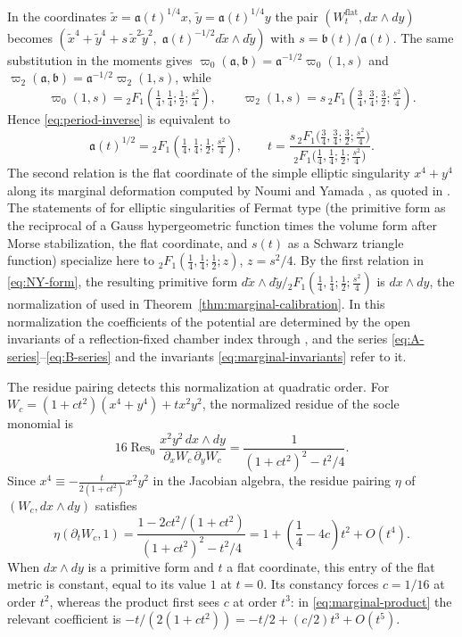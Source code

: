 In the coordinates $\tilde x=\mathfrak a(t)^{1/4}x$, $\tilde y=\mathfrak a(t)^{1/4}y$
the pair $(W^{\mathrm{flat}}_t,dx\wedge dy)$ becomes
$(\tilde x^4+\tilde y^4+s\,\tilde x^2\tilde y^2,\;
\mathfrak a(t)^{-1/2}d\tilde x\wedge d\tilde y)$ with $s=\mathfrak b(t)/\mathfrak a(t)$.  The
same substitution in the moments gives
$\varpi_0(\mathfrak a,\mathfrak b)=\mathfrak a^{-1/2}\varpi_0(1,s)$ and
$\varpi_2(\mathfrak a,\mathfrak b)=\mathfrak a^{-1/2}\varpi_2(1,s)$, while
\[
 \varpi_0(1,s)={}_2F_1\!\left(\tfrac14,\tfrac14;\tfrac12;\tfrac{s^2}4\right),
 \qquad
 \varpi_2(1,s)=s\,{}_2F_1\!\left(\tfrac34,\tfrac34;\tfrac32;\tfrac{s^2}4\right).
\]
Hence \eqref{eq:period-inverse} is equivalent to
\begin{equation}\label{eq:NY-form}
 \mathfrak a(t)^{1/2}={}_2F_1\!\left(\tfrac14,\tfrac14;\tfrac12;\tfrac{s^2}4\right),
 \qquad
 t=\frac{s\,{}_2F_1\bigl(\frac34,\frac34;\frac32;\frac{s^2}4\bigr)}
        {{}_2F_1\bigl(\frac14,\frac14;\frac12;\frac{s^2}4\bigr)} .
\end{equation}
The second relation is the flat coordinate of the simple elliptic
singularity $x^4+y^4$ along its marginal deformation computed by Noumi and
Yamada \cite{noumiyamada1998flat}, as quoted in
\cite[(7), case $\widetilde E_7$]{strachan2010}.
The statements of \cite[Props.~4.2.6--4.2.8]{maher2024predictions} for
elliptic singularities of Fermat type (the primitive form as the reciprocal
of a Gauss hypergeometric function times the volume form after Morse
stabilization, the flat coordinate, and $s(t)$ as a Schwarz triangle
function) specialize here to ${}_2F_1(\frac14,\frac14;\frac12;z)$,
$z=s^2/4$.  By the first relation in \eqref{eq:NY-form}, the resulting
primitive form
$d\tilde x\wedge d\tilde y/{}_2F_1(\frac14,\frac14;\frac12;\frac{s^2}4)$ is
$dx\wedge dy$, the normalization of \cite{grossetal2022open} used in
Theorem~\ref{thm:marginal-calibration}.  In this normalization the
coefficients of the potential are determined by the open invariants of a
reflection-fixed chamber index through \cite[(4.11)]{grossetal2022open}, and
the series \eqref{eq:A-series}--\eqref{eq:B-series} and the invariants
\eqref{eq:marginal-invariants} refer to it.

The residue pairing detects this normalization at quadratic order.  For
$W_c=(1+ct^2)(x^4+y^4)+tx^2y^2$, the normalized residue of the socle
monomial is
\begin{equation}\label{eq:residue-gauge}
 16\operatorname{Res}_0
 \frac{x^2y^2\,dx\wedge dy}{\partial_xW_c\,\partial_yW_c}
 =\frac1{(1+ct^2)^2-t^2/4}.
\end{equation}
Since $x^4\equiv-\frac{t}{2(1+ct^2)}x^2y^2$ in the Jacobian algebra, the
residue pairing $\eta$ of $(W_c,dx\wedge dy)$ satisfies
\begin{equation}\label{eq:KS-gauge}
 \eta(\partial_tW_c,1)
 =\frac{1-2ct^2/(1+ct^2)}{(1+ct^2)^2-t^2/4}
 =1+\left(\frac14-4c\right)t^2+O(t^4).
\end{equation}
When $dx\wedge dy$ is a primitive form and $t$ a flat coordinate, this entry of
the flat metric is constant, equal to its value $1$ at $t=0$.  Its constancy
forces $c=1/16$ at order $t^2$, whereas the product first sees $c$ at order
$t^3$: in \eqref{eq:marginal-product} the relevant coefficient is
$-t/(2(1+ct^2))=-t/2+(c/2)t^3+O(t^5)$.

